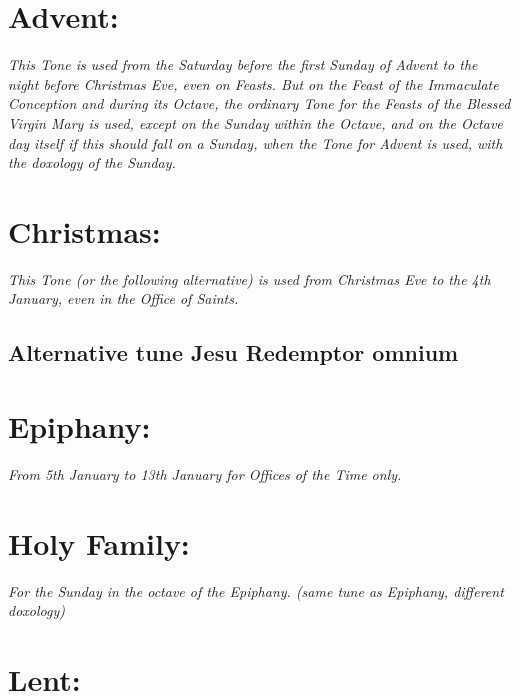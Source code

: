 \documentclass[a5paper,11pt,twoside,openany]{memoir}
\newcommand\rubrics[1]{\textit{#1}}
\begin{document}
\section{Advent:}

\rubrics{This Tone is used from the Saturday before the first Sunday of Advent to the night before Christmas Eve, even on Feasts. But on the Feast of the Immaculate Conception and during its Octave, the ordinary Tone for the Feasts of the Blessed Virgin Mary is used, except on the Sunday within the Octave, and on the Octave day itself if this should fall on a Sunday, when the Tone for Advent is used, with the doxology of the Sunday.}


\newpage

\section{Christmas:}

\rubrics{This Tone (or the following alternative) is used from Christmas Eve to the 4th January, even in the Office of Saints.}


\subsection{Alternative tune Jesu Redemptor omnium}


\section{Epiphany:}

\rubrics{From 5th January to 13th January for Offices of the Time only.}


\section{Holy Family:}

\rubrics{For the Sunday in the octave of the Epiphany. (same tune as Epiphany, different doxology)}



\section{Lent:}
\end{document}
